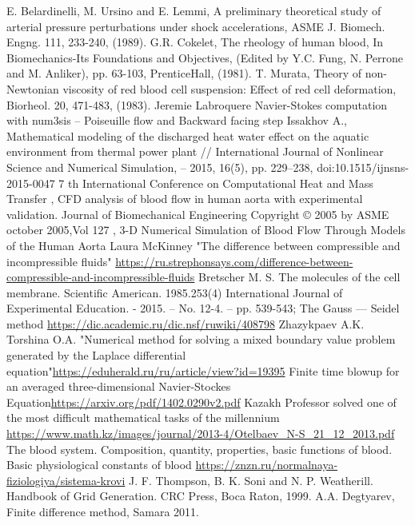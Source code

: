 \begin{thebibliography}{}
E. Belardinelli, M. Ursino and E. Lemmi, A preliminary theoretical study of arterial pressure perturbations under shock accelerations, ASME J. Biomech. Engng. 111, 233-240, (1989).
 G.R. Cokelet, The rheology of human blood, In Biomechanics-Its Foundations and Objectives, (Edited by Y.C. Fung, N. Perrone and M. Anliker), pp. 63-103, PrenticeHall, (1981).
 T. Murata, Theory of non-Newtonian viscosity of red blood cell suspension: Effect of red cell deformation, Biorheol. 20, 471-483, (1983).
 Jeremie Labroquere Navier-Stokes computation with num3sis – Poiseuille flow and Backward facing step
 Issakhov A., Mathematical modeling of the discharged heat water effect on the aquatic environment from thermal power plant // International Journal of Nonlinear Science and Numerical Simulation, – 2015, 16(5), pp. 229–238, doi:10.1515/ijnsns-2015-0047
 7 th International Conference on Computational Heat and Mass Transfer , CFD analysis of blood flow in human aorta with experimental validation.
 Journal of Biomechanical Engineering Copyright © 2005 by ASME october 2005,Vol 127 , 3-D Numerical Simulation of Blood Flow Through Models of the Human Aorta
  Laura McKinney "The difference between compressible and incompressible fluids" \url{https://ru.strephonsays.com/difference-between-compressible-and-incompressible-fluids}
 Bretscher M. S. The molecules of the cell membrane. Scientific American. 1985.253(4)
 International Journal of Experimental Education. - 2015. – No. 12-4. – pp. 539-543;
 The Gauss — Seidel method \url{ https://dic.academic.ru/dic.nsf/ruwiki/408798}
 Zhazykpaev A.K. Torshina O.A. "Numerical method for solving a mixed boundary value problem generated by the Laplace differential equation"\url{https://eduherald.ru/ru/article/view?id=19395}
Finite time blowup for an averaged three-dimensional Navier-Stockes Equation\url{https://arxiv.org/pdf/1402.0290v2.pdf}
 Kazakh Professor solved one of the most difficult mathematical tasks of the millennium \url{ https://www.math.kz/images/journal/2013-4/Otelbaev_N-S_21_12_2013.pdf}
 The blood system. Composition, quantity, properties, basic functions of blood. Basic physiological constants of blood \url{https://znzn.ru/normalnaya-fiziologiya/sistema-krovi}
J. F. Thompson, B. K. Soni and N. P. Weatherill. Handbook of Grid Generation. CRC Press, Boca Raton, 1999.
 A.A. Degtyarev, Finite difference method, Samara 2011.

\end{thebibliography}

